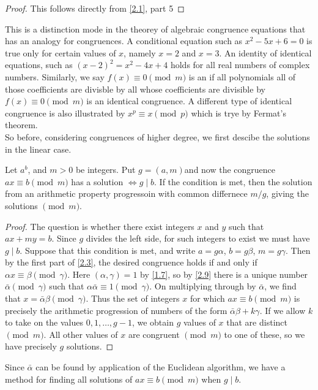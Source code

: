 \documentclass[11pt]{article}
\begin{document}
\begin{proof}
	This follows directly from \cref{2.1}, part 5
\end{proof}
This is a distinction mode in the theorey of algebraic congruence equations that has an analogy for congruences. A conditional equation such as \(x^2 - 5x + 6 = 0\) is true only for certain values of \(x\), namely \(x = 2\) and \(x = 3\). An identity of identical equations, such as \((x - 2)^2 = x^2 - 4x + 4\) holds for all real numbers of complex numbers. Similarly, we say \(f(x) \equiv 0 \pmod{m}\) is an  if all polynomials all of those coefficients are divisble by all whose coefficients are divisible by \(f(x) \equiv 0 \pmod{m}\) is an identical congruence. A different type of identical congruence is also illustrated by \(x^p \equiv x \pmod{p}\) which is trye by Fermat's theorem.\\
So before, considering congruences of higher degree, we first descibe the solutions in the linear case.
\begin{theorem}\label{2.17}
	Let \(a^b\), and \(m > 0\) be integers. Put \(g = (a, m)\)and now the congruence \(ax \equiv b \pmod{m}\) has a solution \(\Leftrightarrow g \mid b\). If the condition is met, then the solution from an arithmetic property progressoin with common differnece \(m / g\), giving the solutions \(\pmod{m}\).
\end{theorem}
\begin{proof}
	The question is whether there exist integers \(x\) and \(y\) such that \(ax + my = b\). Since \(g\) divides the left side, for such integers to exist we must have \(g \mid b\). Suppose that this condition is met, and write \(a = g\alpha\), \(b = g\beta\), \(m = g\gamma\). Then by the first part of \cref{2.3}, the desired congruence holds if and only if \(\alpha x \equiv \beta \pmod{\gamma}\). Here \((\alpha, \gamma) = 1\) by \cref{1.7}, so by \cref{2.9} there is a unique number \(\bar{\alpha} \pmod{\gamma}\) such that \(\alpha \bar{\alpha} \equiv 1 \pmod{\gamma}\). On multiplying through by \(\bar{\alpha}\), we find that \(x = \bar{\alpha} \beta \pmod{\gamma}\). Thus the set of integers \(x\) for which \(ax \equiv b \pmod{m}\) is precisely the arithmetic progression of numbers of the form \(\bar{\alpha} \beta + k\gamma\). If we allow \(k\) to take on the values \(0, 1, \ldots, g - 1\), we obtain \(g\) values of \(x\) that are distinct \(\pmod{m}\). All other values of \(x\) are congruent \(\pmod{m}\) to one of these, so we have precisely \(g\) solutions.
\end{proof}
\begin{fact}
	Since \(\bar \alpha\) can be found by application of the Euclidean algorithm, we have a method for finding all solutions of \(ax \equiv b \pmod{m}\) when \(g \mid b\).
\end{fact}
\end{document}
